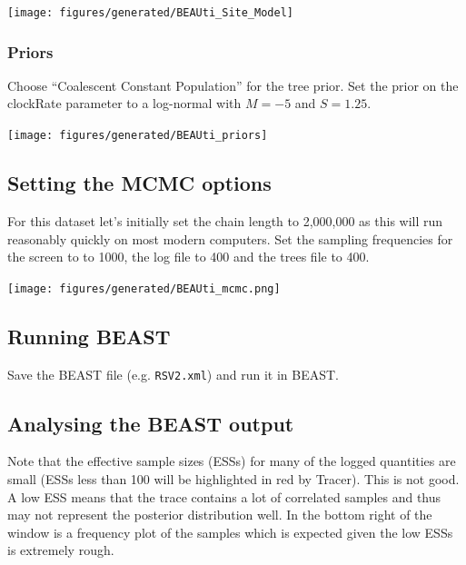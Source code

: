\documentclass[12pt]{article}
\begin{document}
\medskip{}

\texttt{[image: figures/generated/BEAUti\_Site\_Model]}

\medskip{}

\subsubsection{Priors }

Choose ``Coalescent Constant Population'' for the tree prior. Set the prior on the clockRate parameter to a log-normal with $M=-5$ and $S=1.25$. 

\medskip{}

\begin{center}
\texttt{[image: figures/generated/BEAUti\_priors]}
\end{center}

\medskip{}

\subsection{Setting the MCMC options}

For this dataset let's initially set the chain length to 2,000,000 as this will run 
reasonably quickly on most modern computers. Set the sampling frequencies for the screen to
to 1000, the log file to 400 and the trees file to 400.

\begin{center}
\texttt{[image: figures/generated/BEAUti\_mcmc.png]}
\end{center}


\subsection*{Running BEAST}

Save the BEAST file (e.g. \texttt{RSV2.xml}) and run it in BEAST.

\subsection*{Analysing the BEAST output}

Note that the effective sample sizes (ESSs) for many of the logged quantities are small (ESSs less than 100 will be highlighted in red by Tracer).
This is not good. A low ESS means that the trace contains a lot of correlated samples and thus may not represent the
posterior distribution well. In the bottom right of the window is a frequency plot of the samples which is expected given the
low ESSs is extremely rough.
\end{document}
